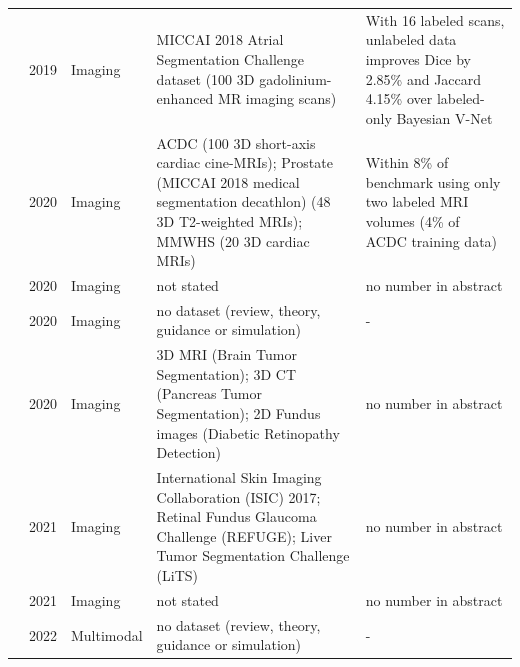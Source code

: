 \begin{longtable}{@{}p{2.6cm}p{0.7cm}p{1.2cm}p{4.4cm}p{4.6cm}@{}}
\cite{yu2019uncertainty} & 2019 & Imaging & MICCAI 2018 Atrial Segmentation Challenge dataset (100 3D gadolinium-enhanced MR imaging scans) & With 16 labeled scans, unlabeled data improves Dice by 2.85\% and Jaccard 4.15\% over labeled-only Bayesian V-Net\\
\cite{chaitanya2020contrastive} & 2020 & Imaging & ACDC (100 3D short-axis cardiac cine-MRIs); Prostate (MICCAI 2018 medical segmentation decathlon) (48 3D T2-weighted MRIs); MMWHS (20 3D cardiac MRIs) & Within 8\% of benchmark using only two labeled MRI volumes (4\% of ACDC training data)\\
\cite{ouyang2020self} & 2020 & Imaging & not stated & no number in abstract\\
\cite{tajbakhsh2020embracing} & 2020 & Imaging & no dataset (review, theory, guidance or simulation) & -\\
\cite{taleb20203d} & 2020 & Imaging & 3D MRI (Brain Tumor Segmentation); 3D CT (Pancreas Tumor Segmentation); 2D Fundus images (Diabetic Retinopathy Detection) & no number in abstract\\
\cite{li2021transformation} & 2021 & Imaging & International Skin Imaging Collaboration (ISIC) 2017; Retinal Fundus Glaucoma Challenge (REFUGE); Liver Tumor Segmentation Challenge (LiTS) & no number in abstract\\
\cite{lu2021data} & 2021 & Imaging & not stated & no number in abstract\\
\cite{krishnan2022self} & 2022 & Multimodal & no dataset (review, theory, guidance or simulation) & -\\
\bottomrule
\end{longtable}

